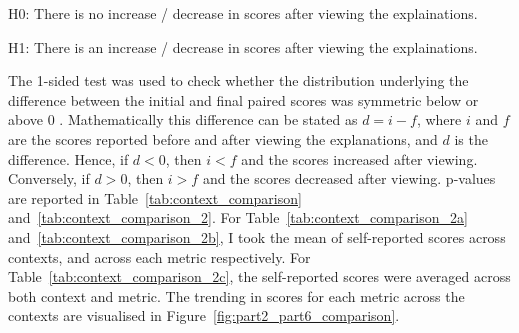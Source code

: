 \noindent H0: There is no increase / decrease in scores after viewing the explainations.

\noindent H1: There is an increase / decrease in scores after viewing the explainations.

The 1-sided test was used to check whether the distribution underlying the difference between the initial and final paired scores was symmetric below or above 0 \cite{scipy}. Mathematically this difference can be stated as $d = i - f$, where $i$ and $f$ are the scores reported before and after viewing the explanations, and $d$ is the difference. Hence, if $d < 0$, then $i < f$ and the scores increased after viewing. Conversely, if $d > 0$, then $i > f$ and the scores decreased after viewing. p-values are reported in Table~\ref{tab:context_comparison} and~\ref{tab:context_comparison_2}. For Table~\ref{tab:context_comparison_2a} and~\ref{tab:context_comparison_2b}, I took the mean of self-reported scores across contexts, and across each metric respectively. For Table~\ref{tab:context_comparison_2c}, the self-reported scores were averaged across both context and metric. The trending in scores for each metric across the contexts are visualised in Figure~\ref{fig:part2_part6_comparison}.

\begin{table}[!ht]
    \centering
    \caption{p-values comparing whether there was a statistically significant increase / decrease in the explainability scores before and after viewing explanations.}
    \label{tab:context_comparison}
\end{table}

